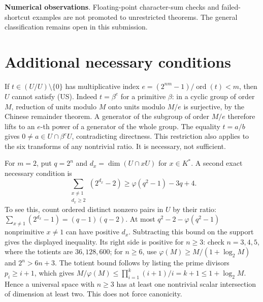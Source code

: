 \documentclass[11pt,a4paper]{article}
\theoremstyle{definition}\newtheorem{definition}[theorem]{Definition}
\theoremstyle{remark}\newtheorem{remark}[theorem]{Remark}
\newcommand{\ord}{\operatorname{ord}}
\newcommand{\US}{\textup{(US)}}
\numberwithin{equation}{section}
\begin{document}
\begin{samepage}
\textbf{Numerical observations}. Floating-point character-sum checks and failed-shortcut examples are not promoted to unrestricted theorems. The general classification remains open in this submission.
\end{samepage}


\section{Additional necessary conditions}
If $t\in(U/U)\setminus\{0\}$ has multiplicative index
$e=(2^{nm}-1)/\ord(t)<m$, then $U$ cannot satisfy \US.
Indeed $t=\beta^e$ for a primitive $\beta$: in a cyclic group of order $M$, reduction of units modulo $M$ onto units modulo $M/e$ is surjective, by the Chinese remainder theorem. A generator of the subgroup of order $M/e$ therefore lifts to an $e$-th power of a generator of the whole group. The equality $t=a/b$ gives $0\ne a\in U\cap\beta^eU$, contradicting directness. This restriction also applies to the six transforms of any nontrivial ratio. It is necessary, not sufficient.

For $m=2$, put $q=2^n$ and $d_x=\dim(U\cap xU)$ for $x\in K^*$. A second exact necessary condition is
\[
\sum_{\substack{x\ne1\\d_x\ge2}}(2^{d_x}-2)
\ge\varphi(q^2-1)-3q+4.
\]
To see this, count ordered distinct nonzero pairs in $U$ by their ratio:
$\sum_{x\ne1}(2^{d_x}-1)=(q-1)(q-2)$.
At most $q^2-2-\varphi(q^2-1)$ nonprimitive $x\ne1$ can have positive $d_x$. Subtracting this bound on the support gives the displayed inequality. Its right side is positive for $n\ge3$: check $n=3,4,5$, where the totients are $36,128,600$; for $n\ge6$, use $\varphi(M)\ge M/(1+\log_2 M)$ and $2^n>6n+3$. The totient bound follows by listing the prime divisors $p_i\ge i+1$, which gives $M/\varphi(M)\le\prod_{i=1}^k(i+1)/i=k+1\le1+\log_2 M$. Hence a universal space with $n\ge3$ has at least one nontrivial scalar intersection of dimension at least two. This does not force canonicity.
\end{document}
